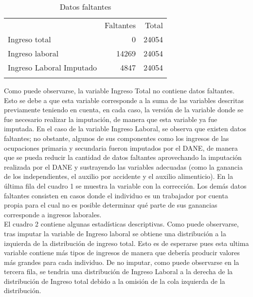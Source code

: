 \documentclass[11pt,a4paper]{article}
\begin{document}
\begin{table}[H]
    \centering
    \caption{Datos faltantes} 
    \label{tab:missing}
    \begingroup\fontsize{9pt}{10pt}\selectfont
    \begin{tabular}{lrr}
      \hline
    \addlinespace
      & Faltantes & Total \\
    \addlinespace
     \hline
     Ingreso total &   0 & 24054 \\ 
      Ingreso laboral & 14269 & 24054 \\ 
      Ingreso Laboral Imputado & 4847 & 24054 \\ 
       \addlinespace
    \hline
    \addlinespace
    \end{tabular}
    \endgroup
    \end{table}
Como puede observarse, la variable Ingreso Total no contiene datos faltantes. Esto se debe a que esta variable corresponde a la suma de las variables descritas previamente teniendo en cuenta, en cada caso, la versión de la variable donde se fue necesario realizar la imputación,
de manera que esta variable ya fue imputada. En el caso de la variable Ingreso Laboral, se observa que existen datos faltantes; no obstante, algunos de sus componentes como los ingresos de las ocupaciones primaria y secundaria fueron imputados por el DANE, de manera que se pueda reducir la cantidad de datos faltantes
aprovechando la imputación realizada por el DANE y sustrayendo las variables adecuadas (como la ganancia de los independientes, el auxilio por accidente y el auxilio alimenticio).
En la última fila del cuadro 1 se muestra la variable con la corrección. Los demás datos faltantes consisten en casos donde el individuo es un trabajador por cuenta propia para el cual no es posible determinar qué parte de sus ganancias corresponde a ingresos laborales.\\
El cuadro 2 contiene algunas estadísticas descriptivas. Como puede observarse, tras imputar la variable de Ingreso laboral se obtiene una distribución a la izquierda de la distribución de ingreso total. Esto es de esperarse pues 
esta ultima variable contiene más tipos de ingresos de manera que debería producir valores más grandes para cada individuo. De no imputar, como puede observarse en la tercera fila, se tendria una distribución de Ingreso Laboral a la derecha de la distribución de Ingreso total debido
a la omisión de la cola izquierda de la distribución.
\end{document}

